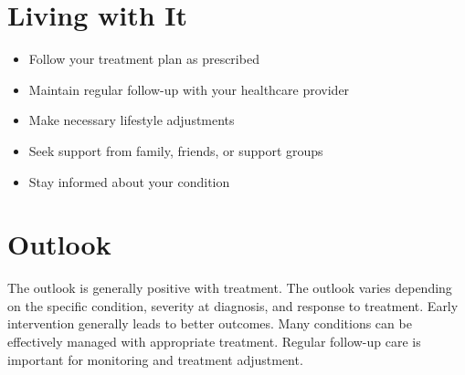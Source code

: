 \section{Living with It}
\begin{itemize}[noitemsep]
  \item Follow your treatment plan as prescribed
  \item Maintain regular follow-up with your healthcare provider
  \item Make necessary lifestyle adjustments
  \item Seek support from family, friends, or support groups
  \item Stay informed about your condition
\end{itemize}
\section{Outlook}
The outlook is generally positive with treatment. The outlook varies depending on the specific condition, severity at diagnosis, and response to treatment. Early intervention generally leads to better outcomes. Many conditions can be effectively managed with appropriate treatment. Regular follow-up care is important for monitoring and treatment adjustment.
